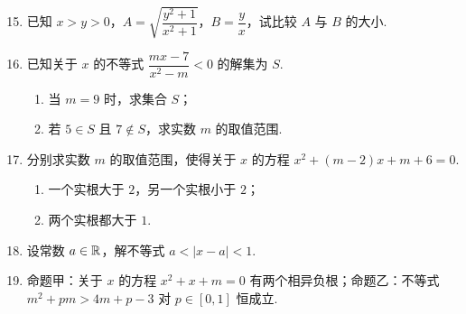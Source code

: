\documentclass[a4paper,11pt]{article}
\begin{document}
\begin{enumerate}
\setcounter{enumi}{14}

\item 已知 $x>y>0$，$A=\sqrt{\dfrac{y^2+1}{x^2+1}}$，$B=\dfrac yx$，试比较 $A$ 与 $B$
的大小.


\ansspace[6]

\item 已知关于 $x$ 的不等式 $\dfrac{mx-7}{x^2-m}<0$ 的解集为 $S$.

\begin{enumerate}[label=(\arabic*)]
\item 当 $m=9$ 时，求集合 $S$；
\item 若 $5\in S$ 且 $7\notin S$，求实数 $m$ 的取值范围.
\end{enumerate}

\ifanswer
\solbegin
{}
\solend

\fi

\ansspace[6]

\item 分别求实数 $m$ 的取值范围，使得关于 $x$ 的方程 $x^2+(m-2)x+m+6=0$.

\begin{enumerate}[label=(\arabic*)]
\item 一个实根大于 $2$，另一个实根小于 $2$；
\item 两个实根都大于 $1$.
\end{enumerate}

\ans{（1）$m\in(-\infty,-2)$；（2）$m\in\left(-\dfrac52,-2\right]$}

\ansspace[6]

\item 设常数 $a\in\mathbb{R}$，解不等式 $a<|x-a|<1$.


\ansspace[6]

\item 命题甲：关于 $x$ 的方程 $x^2+x+m=0$ 有两个相异负根；命题乙：不等式
$m^2+pm>4m+p-3$ 对 $p\in[0,1]$ 恒成立.


\end{enumerate}
\end{document}
